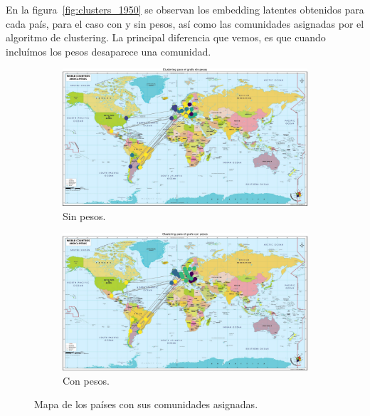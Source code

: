 \documentclass{article}
\begin{document}
En la figura~\ref{fig:clusters_1950} se observan los embedding latentes obtenidos para cada país, para el caso con y sin pesos, así como las comunidades asignadas por el algoritmo de clustering. La principal diferencia que vemos, es que cuando incluímos los pesos desaparece
una comunidad.

\begin{figure}[htb]
    \centering
    \begin{subfigure}{0.49\textwidth}
        \centering
        \includegraphics[width=\linewidth]{images/mapas/mapa_sin_pesos_1950.pdf}
        \caption{Sin pesos.}
        \label{fig:1950_sin_pesos}
    \end{subfigure}
    \begin{subfigure}{0.49\textwidth}
        \centering
        \includegraphics[width=\linewidth]{images/mapas/mapa_con_pesos_1950.pdf}
        \caption{Con pesos.}
        \label{fig:1950_con_pesos}
    \end{subfigure}
    \caption{Mapa de los países con sus comunidades asignadas.}
    \label{fig:mapa_1950}
\end{figure}
\end{document}
